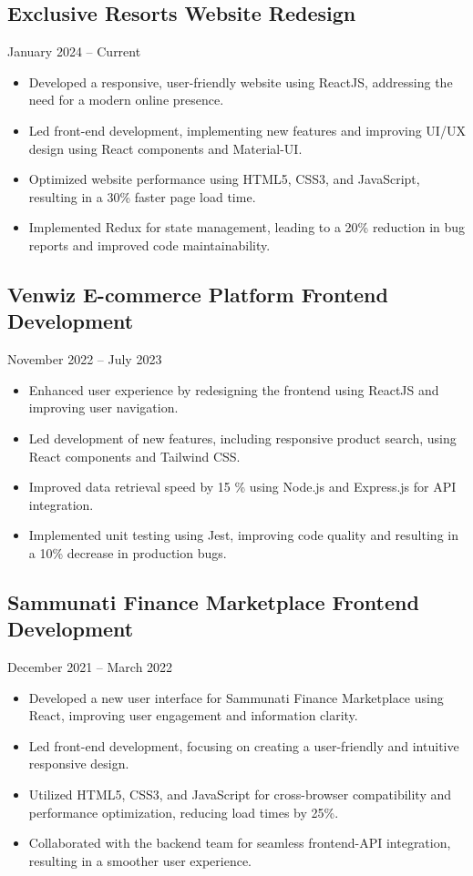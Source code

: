 \documentclass[10pt, letterpaper]{article}
\begin{document}
        \subsection{Exclusive Resorts Website Redesign}
            January 2024 – Current
            \begin{itemize}[leftmargin=*]
                \item Developed a responsive, user-friendly website using ReactJS, addressing the need for a modern online presence.
                \item Led front-end development, implementing new features and improving UI/UX design using React components and Material-UI.
                \item Optimized website performance using HTML5, CSS3, and JavaScript, resulting in a 30\% faster page load time.
                \item Implemented Redux for state management, leading to a 20\% reduction in bug reports and improved code maintainability.
            \end{itemize}
        \subsection{Venwiz E-commerce Platform Frontend Development}
            November 2022 – July 2023
            \begin{itemize}[leftmargin=*]
                \item Enhanced user experience by redesigning the frontend using ReactJS and improving user navigation.
                \item Led development of new features, including responsive product search, using React components and Tailwind CSS.
                \item Improved data retrieval speed by 15 \% using Node.js and Express.js for API integration.
                \item Implemented unit testing using Jest, improving code quality and resulting in a 10\% decrease in production bugs.
            \end{itemize}
        \subsection{Sammunati Finance Marketplace Frontend Development}
            December 2021 – March 2022
            \begin{itemize}[leftmargin=*]
                \item Developed a new user interface for Sammunati Finance Marketplace using React, improving user engagement and information clarity.
                \item Led front-end development, focusing on creating a user-friendly and intuitive responsive design.
                \item Utilized HTML5, CSS3, and JavaScript for cross-browser compatibility and performance optimization, reducing load times by 25\%.
                \item Collaborated with the backend team for seamless frontend-API integration, resulting in a smoother user experience.
            \end{itemize}
\end{document}
